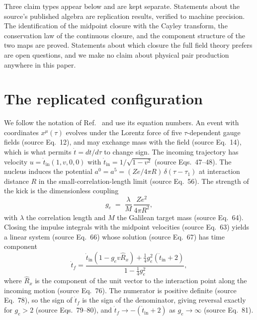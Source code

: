 \documentclass[aps,prd,reprint,nofootinbib]{revtex4-2}
\begin{document}
Three claim types appear below and are kept separate.  Statements about
the source's published algebra are replication results, verified to
machine precision.  The identification of the midpoint closure with the
Cayley transform, the conservation law of the continuous closure, and
the component structure of the two maps are proved.  Statements about
which closure the full field theory prefers are open questions, and we
make no claim about physical pair production anywhere in this paper.

\section{The replicated configuration}
\label{sec:config}

We follow the notation of Ref.~\cite{Land2016} and use its equation
numbers.  An event with coordinates $x^{\mu}(\tau)$ evolves under the
Lorentz force of five $\tau$-dependent gauge fields (source Eq.~12),
and may exchange mass with the field (source Eq.~14), which is what
permits $\dot t = dt/d\tau$ to change sign.  The incoming trajectory has
velocity $u = \dot t_{\mathrm{in}}(1, v, 0, 0)$ with
$\dot t_{\mathrm{in}} = 1/\sqrt{1 - v^{2}}$ (source Eqs.~47--48).  The
nucleus induces the potential $a^{0} = a^{5} = (Ze/4\pi R)\,
\delta(\tau - \tau_{1})$ at interaction distance $R$ in the
small-correlation-length limit (source Eq.~56).  The strength of the
kick is the dimensionless coupling
\begin{equation}
g_{e} \;=\; \frac{\lambda}{M}\,\frac{Ze^{2}}{4\pi R^{2}},
\label{eq:ge}
\end{equation}
with $\lambda$ the correlation length and $M$ the Galilean target mass
(source Eq.~64).  Closing the impulse integrals with the midpoint
velocities (source Eq.~63) yields a linear system (source Eq.~66) whose
solution (source Eq.~67) has time component
\begin{equation}
\dot t_{f}
= \frac{\dot t_{\mathrm{in}}\left(1 - g_{e} v \hat R_{x}\right)
+ \tfrac{1}{4} g_{e}^{2}\left(\dot t_{\mathrm{in}} + 2\right)}
{1 - \tfrac{1}{4} g_{e}^{2}},
\label{eq:tdotf}
\end{equation}
where $\hat R_{x}$ is the component of the unit vector to the
interaction point along the incoming motion (source Eq.~76).  The
numerator is positive definite (source Eq.~78), so the sign of
$\dot t_{f}$ is the sign of the denominator, giving reversal exactly for
$g_{e} > 2$ (source Eqs.~79--80), and
$\dot t_{f} \to -(\dot t_{\mathrm{in}} + 2)$ as $g_{e} \to \infty$
(source Eq.~81).
\end{document}
